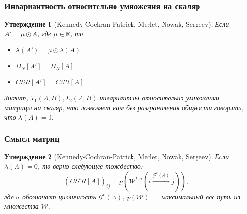 \documentclass{beamer}
\newtheorem*{Prop}{Утверждение}
\newcommand{\cwhite}[1]{\textcolor{white}{#1}}
\begin{document}

\begin{frame}
\frametitle{Инвариантность относительно умножения на скаляр}
\begin{Prop}[Kennedy-Cochran-Patrick, Merlet, Nowak, Sergeev]
Если $A' = \mu \odot A$, где $\mu \in \mathbb{R}$, то 

\begin{itemize}
	\item $\lambda(A') = \mu \odot \lambda(A)$
	\item $B_N[A'] = B_N[A]$
	\item $CSR[A'] = CSR[A]$
\end{itemize}

Значит, $T_1(A, B), T_2(A, B)$ инвариантны относительно умножении матрицы на скаляр, что позволяет нам без разграничения общности говорить, что $\lambda(A) = 0$.

\end{Prop}
\end{frame}



\begin{frame}
\frametitle{Смысл матриц $\cwhite{CSR}$}
\begin{Prop}[Kennedy-Cochran-Patrick, Merlet, Nowak, Sergeev]
Если $\lambda(A) = 0$, то верно следующее тождество:
\begin{equation}
    (CS^tR[A])_{ij} = p(\mathcal{W}^{t, \sigma}(i \xrightarrow{\mathcal{G}^c(A)} j)),
\end{equation}
где $\sigma$ обозначает цикличность $\mathcal{G}^c(A)$, $p(\mathcal{W})$ --- максимальный вес пути из множества $\mathcal{W}$,
\end{Prop}
\end{frame}
\end{document}
